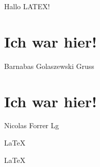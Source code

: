 \documentclass{article}
\begin{document}
Hallo LATEX!  

\section{Ich war hier!}
Barnabas Golaszewski
Gruss

\section{Ich war hier!}
Nicolas Forrer
Lg

\LaTeX 

\huge
\LaTeX 
   
\end{document}
